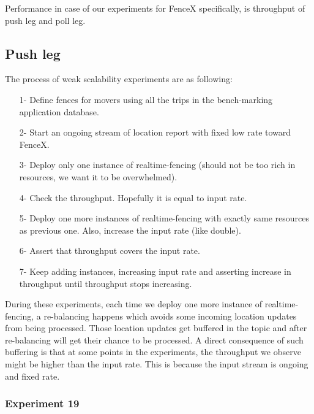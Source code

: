 \documentclass[a4]{report}
\begin{document}
        Performance in case of our experiments for FenceX specifically, is throughput of push leg and poll leg.

        \subsection{Push leg}
        The process of weak scalability experiments are as following:
        \begin{itemize}
            \item[1-] Define fences for movers using all the trips in the bench-marking application database.
            \item[2-] Start an ongoing stream of location report with fixed low rate toward FenceX.
            \item[3-] Deploy only one instance of realtime-fencing (should not be too rich in resources, we want it to
            be overwhelmed).
            \item[4-] Check the throughput. Hopefully it is equal to input rate.
            \item[5-] Deploy one more instances of realtime-fencing with exactly same resources as previous one. Also,
            increase the input rate (like double).
            \item[6-] Assert that throughput covers the input rate.
            \item[7-] Keep adding instances, increasing input rate and asserting increase in throughput until throughput
            stops increasing.
        \end{itemize}

        During these experiments, each time we deploy one more instance of realtime-fencing, a re-balancing happens which
        avoids some incoming location updates from being processed.
        Those location updates get buffered in the topic and after re-balancing will get their chance to be processed.
        A direct consequence of such buffering is that at some points in the experiments, the throughput we observe might be
        higher than the input rate.
        This is because the input stream is ongoing and fixed rate.

        \subsubsection{Experiment 19}
\end{document}
